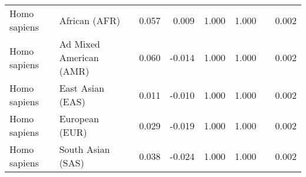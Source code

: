 \begin{center}
\begin{adjustbox}{width = 1\textwidth}
\begin{tabular}{|l|l|r|r|r|r|r|}
        Homo sapiens &                   African (AFR) &                                              0.057 &                                              0.009 &                1.000 &                                  1.000~~ &              0.002 \\
        Homo sapiens &         Ad Mixed American (AMR) &                                              0.060 &                                             -0.014 &                1.000 &                                  1.000~~ &              0.002 \\
        Homo sapiens &                East Asian (EAS) &                                              0.011 &                                             -0.010 &                1.000 &                                  1.000~~ &              0.002 \\
        Homo sapiens &                  European (EUR) &                                              0.029 &                                             -0.019 &                1.000 &                                  1.000~~ &              0.002 \\
        Homo sapiens &               South Asian (SAS) &                                              0.038 &                                             -0.024 &                1.000 &                                  1.000~~ &              0.002 \\
\bottomrule
\end{tabular}
\end{adjustbox}
\newpage
\end{center}
